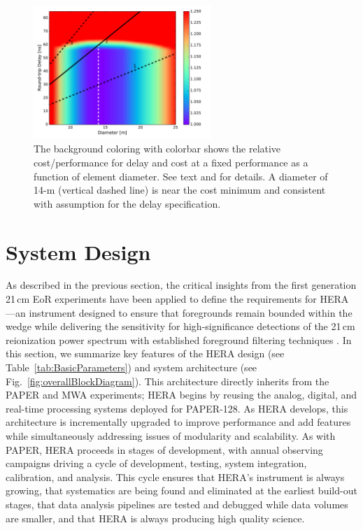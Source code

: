 \documentclass[preprint,11pt]{aastex}
\begin{document}
\begin{figure}[t]
\centerline{
\includegraphics[width=0.6\textwidth]{plots/costfig.pdf} 
}
\caption{\small The background coloring with colorbar shows the relative cost/performance for delay and cost at a fixed performance as a function of element diameter.  See text and \cite{elementmemo} for details.  A diameter of 14-m (vertical dashed line) is near the cost minimum and consistent with assumption for the delay specification.
\label{fig:costfig}}
\end{figure}

\section{System Design} \label{sec:design}
As described in the previous section, the critical insights from the first generation 21\,cm EoR experiments have been applied to define
the requirements for HERA---an instrument designed to ensure that foregrounds remain bounded
within the wedge while delivering the sensitivity for
high-significance detections of the 21\,cm reionization power spectrum with
established foreground filtering techniques
\citep{pober_et_al2014,greig_and_mesinger2015}.
In this section, we summarize key features of the HERA design (see Table~\ref{tab:BasicParameters}) 
and system architecture (see Fig.~\ref{fig:overallBlockDiagram}).
This architecture
directly inherits from the PAPER and MWA experiments; HERA begins by reusing the
analog, digital, and real-time processing systems deployed for PAPER-128.  As HERA develops, this
architecture is incrementally upgraded to improve performance and add features while simultaneously
addressing issues of modularity and scalability.  As with PAPER, HERA proceeds in stages of development,
with annual observing campaigns driving a cycle of development, testing, system integration, calibration, and analysis.
This cycle ensures that HERA's instrument is always growing, that systematics are being found and eliminated at the
earliest build-out stages, that data analysis pipelines are tested and debugged while data volumes are smaller,
and that HERA is always producing high quality science.
\end{document}

